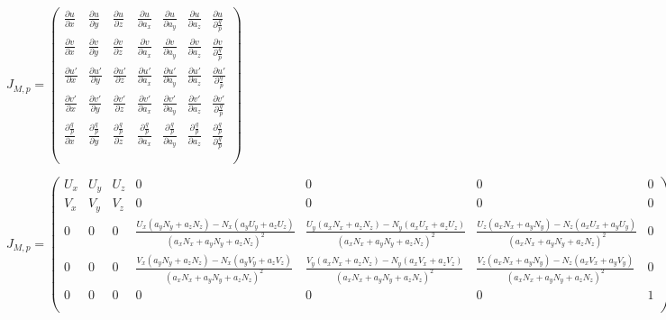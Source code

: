 \documentclass{article}
\begin{document}
$J_{M,p}=\left(\begin{array}{ccccccc}\frac{\partial u}{\partial x} & \frac{\partial u}{\partial y} & \frac{\partial u}{\partial z} & \frac{\partial u}{\partial a_{x}} & \frac{\partial u}{\partial a_{y}} & \frac{\partial u}{\partial a_{z}} & \frac{\partial u}{\partial\frac{q}{p}}\\\frac{\partial v}{\partial x} & \frac{\partial v}{\partial y} & \frac{\partial v}{\partial z} & \frac{\partial v}{\partial a_{x}} & \frac{\partial v}{\partial a_{y}} & \frac{\partial v}{\partial a_{z}} & \frac{\partial v}{\partial\frac{q}{p}}\\\frac{\partial u\prime}{\partial x} & \frac{\partial u\prime}{\partial y} & \frac{\partial u\prime}{\partial z} & \frac{\partial u\prime}{\partial a_{x}} & \frac{\partial u\prime}{\partial a_{y}} & \frac{\partial u\prime}{\partial a_{z}} & \frac{\partial u\prime}{\partial\frac{q}{p}}\\\frac{\partial v\prime}{\partial x} & \frac{\partial v\prime}{\partial y} & \frac{\partial v\prime}{\partial z} & \frac{\partial v\prime}{\partial a_{x}} & \frac{\partial v\prime}{\partial a_{y}} & \frac{\partial v\prime}{\partial a_{z}} & \frac{\partial v\prime}{\partial\frac{q}{p}}\\ \frac{\partial\frac{q}{p}}{\partial x} & \frac{\partial\frac{q}{p}}{\partial y} & \frac{\partial\frac{q}{p}}{\partial z} & \frac{\partial\frac{q}{p}}{\partial a_{x}} & \frac{\partial\frac{q}{p}}{\partial a_{y}} & \frac{\partial\frac{q}{p}}{\partial a_{z}} & \frac{\partial\frac{q}{p}}{\partial\frac{q}{p}}\\ \\\end{array}\right)$
\pagebreak

$J_{M,p}=\left(\begin{array}{ccccccc} U_{x} & U_{y} & U_{z} & 0 & 0 & 0 & 0\\ V_{x} & V_{y} & V_{z} & 0 & 0 & 0 & 0\\ 0 & 0 & 0 & \frac{U_{x}\left(a_{y}N_{y}+a_{z}N_{z}\right)-N_{x}\left(a_{y}U_{y}+a_{z}U_{z}\right)}{\left(a_{x}N_{x}+a_{y}N_{y}+a_{z}N_{z}\right)^{2}} & \frac{U_{y}\left(a_{x}N_{x}+a_{z}N_{z}\right)-N_{y}\left(a_{x}U_{x}+a_{z}U_{z}\right)}{\left(a_{x}N_{x}+a_{y}N_{y}+a_{z}N_{z}\right)^{2}} & \frac{U_{z}\left(a_{x}N_{x}+a_{y}N_{y}\right)-N_{z}\left(a_{x}U_{x}+a_{y}U_{y}\right)}{\left(a_{x}N_{x}+a_{y}N_{y}+a_{z}N_{z}\right)^{2}} & 0\\ 0 & 0 & 0 & \frac{V_{x}\left(a_{y}N_{y}+a_{z}N_{z}\right)-N_{x}\left(a_{y}V_{y}+a_{z}V_{z}\right)}{\left(a_{x}N_{x}+a_{y}N_{y}+a_{z}N_{z}\right)^{2}} & \frac{V_{y}\left(a_{x}N_{x}+a_{z}N_{z}\right)-N_{y}\left(a_{x}V_{x}+a_{z}V_{z}\right)}{\left(a_{x}N_{x}+a_{y}N_{y}+a_{z}N_{z}\right)^{2}} & \frac{V_{z}\left(a_{x}N_{x}+a_{y}N_{y}\right)-N_{z}\left(a_{x}V_{x}+a_{y}V_{y}\right)}{\left(a_{x}N_{x}+a_{y}N_{y}+a_{z}N_{z}\right)^{2}} & 0\\ 0 & 0 & 0 & 0 & 0 & 0 & 1\\ \\\end{array}\right)$
\pagebreak
\end{document}
